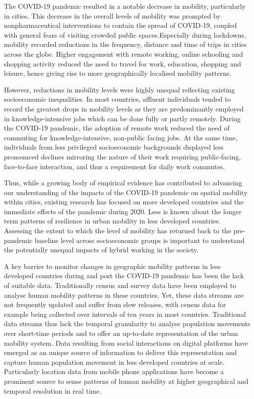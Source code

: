 \documentclass[
  11pt,
]{article}
\begin{document}
The COVID-19 pandemic resulted in a notable decrease in mobility,
particularly in cities. This decrease in the overall levels of mobility
was prompted by nonpharmaceutical interventions to contain the spread of
COVID‐19, coupled with general fears of visiting crowded public
spaces.Especially during lockdowns, mobility recorded reductions in the
frequency, distance and time of trips in cities across the globe. Higher
engagement with remote working, online schooling and shopping activity
reduced the need to travel for work, education, shopping and leisure,
hence giving rise to more geographically localised mobility patterns.

However, reductions in mobility levels were highly unequal reflecting
existing socioeconomic inequalities. In most countries, affluent
individuals tended to record the greatest drops in mobility levels as
they are predominantly employed in knowledge-intensive jobs which can be
done fully or partly remotely. During the COVID-19 pandemic, the
adoption of remote work reduced the need of commuting for
knowledge-intensive, non-public facing jobs. At the same time,
individuals from less privileged socioeconomic backgrounds displayed
less pronounced declines mirroring the nature of their work requiring
public-facing, face-to-face interaction, and thus a requirement for
daily work commutes.

Thus, while a growing body of empirical evidence has contributed to
advancing our understanding of the impacts of the COVID-19 pandemic on
spatial mobility within cities, existing research has focused on more
developed countries and the immediate effects of the pandemic during
2020. Less is known about the longer term patterns of resilience in
urban mobility in less developed countries. Assessing the extent to
which the level of mobility has returned back to the pre-pandemic
baseline level across socioeconomic groups is important to understand
the potentially unequal impacts of hybrid working in the society.

A key barrier to monitor changes in geographic mobility patterns in less
developed countries during and post the COVID-19 pandemic has been the
lack of suitable data. Traditionally census and survey data have been
employed to analyse human mobility patterns in these countries. Yet,
these data streams are not frequently updated and suffer from slow
releases, with census data for example being collected over intervals of
ten years in most countries. Traditional data streams thus lack the
temporal granularity to analyse population movements over short-time
periods and to offer an up-to-date representation of the urban mobility
system. Data resulting from social interactions on digital platforms
have emerged as an unique source of information to deliver this
representation and capture human population movement in less developed
countries at scale. Particularly location data from mobile phone
applications have become a prominent source to sense patterns of human
mobility at higher geographical and temporal resolution in real time.
\end{document}
